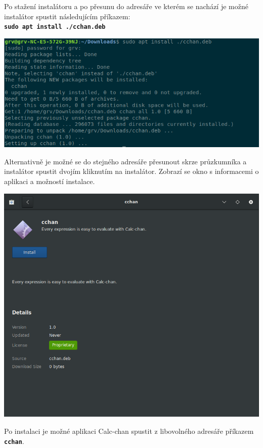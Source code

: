 \documentclass[a4paper, 11pt]{article}
\begin{document}
\noindent Po stažení instalátoru a po přesunu do adresáře ve kterém se nachází je možné instalátor spustit následujícím příkazem:\\
\texttt{\textbf{sudo apt install ./cchan.deb}}\\
\begin{center}
\includegraphics[scale=0.65]{installterminal.png}\\
\end{center}
\newpage
\noindent Alternativně je možné se do stejného adresáře přesunout skrze průzkumníka a instalátor spustit dvojím kliknutím na instalátor. Zobrazí se okno s informacemi o aplikaci a možností instalace.\\
\begin{center}
\includegraphics[scale=0.60]{installmanager.png}\\
\end{center}
\newpage
\noindent Po instalaci je možné aplikaci Calc-chan spustit z libovolného adresáře příkazem \texttt{\textbf{cchan}}.\\
\end{document}
